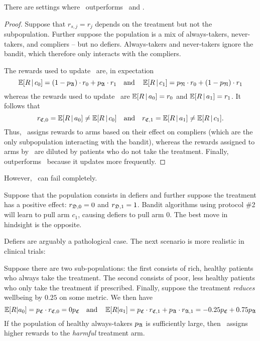 \begin{prop}\label{prop:actual}
	There are settings where \actual\, outperforms \chosen\, and \comply.
\end{prop}
\begin{proof}
	Suppose that $r_{s,j}=r_j$ depends on the treatment but not the subpopulation. Further suppose the population is a mix of always-takers, never-takers, and compliers -- but no defiers. 
	Always-takers and never-takers ignore the bandit, which therefore only interacts with the compliers. 

	The rewards used to update \chosen\, are, in expectation 
	\begin{equation}
		\operatorname*{\mathbb E}[R\,|\,c_0] 
		= (1-p_{\mathfrak A})\cdot r_0 + p_{\mathfrak A}\cdot r_1
		\quad\text{and}\quad
		\operatorname*{\mathbb E}[R\,|\,c_1]
		= p_{\mathfrak N}\cdot r_0 + (1-p_{\mathfrak N})\cdot r_1
	\end{equation}
	whereas the rewards used to update \actual\, are $\operatorname*{\mathbb E}[R\,|\,a_0] = r_0$ and $\operatorname*{\mathbb E}[R\,|\,a_1] = r_1$.
	It follows that
	\begin{equation}
		r_{{\mathfrak C},0} = \operatorname*{\mathbb E}[R\,|\,a_0] \neq \operatorname*{\mathbb E}[R\,|\,c_0] 
		\quad\text{and}\quad
		r_{{\mathfrak C},1} = \operatorname*{\mathbb E}[R\,|\,a_1] \neq \operatorname*{\mathbb E}[R\,|\,c_1].
	\end{equation}
	Thus, \actual\, assigns rewards to arms based on their effect on compliers (which are the only subpopulation interacting with the bandit), whereas the rewards assigned to arms by \chosen\, are diluted by patients who do not take the treatment. Finally, \actual\, outperforms \comply\, because it updates more frequently.
\end{proof}

However, \actual\, can fail completely.
\begin{eg}\label{eg:defiers}\eod
	Suppose that the population consists in defiers and further suppose the treatment has a positive effect: $r_{{\mathfrak D},0}=0$ and $r_{{\mathfrak D},1}=1$.
	Bandit algorithms using protocol \#2 will learn to pull arm $c_1$, causing defiers to pull arm $0$. The best move in hindsight is the opposite.
\end{eg}
Defiers are arguably a pathological case. The next scenario is more realistic in clinical trials:
\begin{eg}\label{eg:rich}\eod
	Suppose there are two sub-populations: the first consists of rich, healthy patients who always take the treatment. The second consists of poor, less healthy patients who only take the treatment if prescribed. Finally, suppose the treatment \emph{reduces} wellbeing by $0.25$ on some metric. We then have
	\begin{equation}
	    \operatorname*{\mathbb E}[R|a_0] = p_{\mathfrak C} \cdot r_{{\mathfrak C},0} = 0p_{\mathfrak C} 
	    \quad\text{and}\quad
	    \operatorname*{\mathbb E}[R|a_1] = p_{\mathfrak C} \cdot r_{{\mathfrak C},1} + p_{\mathfrak A}\cdot r_{{\mathfrak A},1}
	    = -0.25p_{\mathfrak C} + 0.75p_{\mathfrak A}
	\end{equation}
	If the population of healthy always-takers $p_{\mathfrak A}$ is sufficiently large, then \actual\, assigns higher rewards to the \emph{harmful} treatment arm.
\end{eg}


